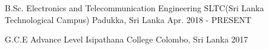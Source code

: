 

\begin{cventries}

  \cventry
  {B.Sc. Electronics and Telecommunication Engineering} %
  {SLTC(Sri Lanka Technological Campus)} %
  {Padukka, Sri Lanka} %
  {Apr. 2018 - PRESENT} %
  {
    \begin{cvitems} %
      \item {}
    \end{cvitems}
  }


  \cventry
  {G.C.E Advance Level} %
  {Isipathana College} %
  {Colombo, Sri Lanka} %
  {2017} %
  {
    \begin{cvitems} %
      \item {}
    \end{cvitems}
  }


\end{cventries}
